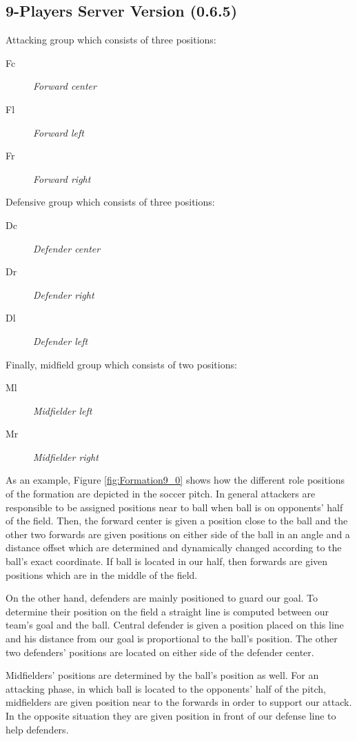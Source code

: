 \subsection{9-Players Server Version (0.6.5)}
Attacking group which consists of three positions:
\begin{description}
\item[Fc] \textit{Forward center}
\item[Fl] \textit{Forward left}
\item[Fr] \textit{Forward right}
\end{description}
Defensive group which consists of three positions:
\begin{description}
\item[Dc] \textit{Defender center}
\item[Dr] \textit{Defender right }
\item[Dl] \textit{Defender left}
\end{description}
Finally, midfield group which consists of two positions:
\begin{description}
\item[Ml] \textit{Midfielder left}
\item[Mr] \textit{Midfielder right}
\end{description}
As an example, Figure \ref{fig:Formation9_0} shows how the different role positions of the formation are depicted in the soccer pitch. In general attackers are responsible to be assigned positions near to ball when ball is on opponents' half of the field. Then, the forward center  is given a position close to the ball and the other two forwards are given positions on either side of the ball in an angle and a distance offset which are determined and dynamically changed according to the ball's exact coordinate. If ball is located in our half, then forwards are given positions which are in the middle of the field. 

On the other hand, defenders are mainly positioned to guard our goal. To determine their position on the field a straight line is computed between our team's  goal and the ball. Central defender is given a position placed on this line and his distance from our goal is proportional to the ball's position. The other two defenders' positions are located on either side of the defender center. 

Midfielders' positions are determined by the ball's position as well. For an attacking phase, in which ball is located to the opponents' half of the pitch, midfielders are given position near to the forwards in order to support our attack. In the opposite situation they are given position in front of our defense line to help defenders. 

